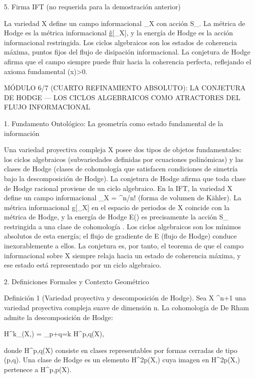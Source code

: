 \documentclass[12pt,a4paper]{book}
\begin{document}
5. Firma IFT (no requerida para la demostración anterior)

La variedad X define un campo informacional \rho_X con acción S_{}. La métrica de Hodge es la métrica informacional g̃[\rho_X], y la energía de Hodge es la acción informacional restringida. Los ciclos algebraicos son los estados de coherencia máxima, puntos fijos del flujo de disipación informacional. La conjetura de Hodge afirma que el campo siempre puede fluir hacia la coherencia perfecta, reflejando el axioma fundamental \rho(x)>0.

MÓDULO 6/7 (CUARTO REFINAMIENTO ABSOLUTO): LA CONJETURA DE HODGE — LOS CICLOS ALGEBRAICOS COMO ATRACTORES DEL FLUJO INFORMACIONAL

1. Fundamento Ontológico: La geometría como estado fundamental de la información

Una variedad proyectiva compleja X posee dos tipos de objetos fundamentales: los ciclos algebraicos (subvariedades definidas por ecuaciones polinómicas) y las clases de Hodge (clases de cohomología que satisfacen condiciones de simetría bajo la descomposición de Hodge). La conjetura de Hodge afirma que toda clase de Hodge racional proviene de un ciclo algebraico. En la IFT, la variedad X define un campo informacional \rho_X = \omega^n/n! (forma de volumen de Kähler). La métrica informacional g[\rho_X] en el espacio de periodos de X coincide con la métrica de Hodge, y la energía de Hodge E(\alpha) es precisamente la acción S_{} restringida a una clase de cohomología \alpha. Los ciclos algebraicos son los mínimos absolutos de esta energía; el flujo de gradiente de E (flujo de Hodge) conduce inexorablemente a ellos. La conjetura es, por tanto, el teorema de que el campo informacional sobre X siempre relaja hacia un estado de coherencia máxima, y ese estado está representado por un ciclo algebraico.

2. Definiciones Formales y Contexto Geométrico

Definición 1 (Variedad proyectiva y descomposición de Hodge). Sea X \subset {}^{n+1} una variedad proyectiva compleja suave de dimensión n. La cohomología de De Rham admite la descomposición de Hodge:

H^k_{}(X,) = \bigoplus_{p+q=k} H^{p,q}(X),

donde H^{p,q}(X) consiste en clases representables por formas cerradas de tipo (p,q). Una clase de Hodge es un elemento \alpha \in H^{2p}(X,) cuya imagen en H^{2p}(X,) pertenece a H^{p,p}(X).
\end{document}
